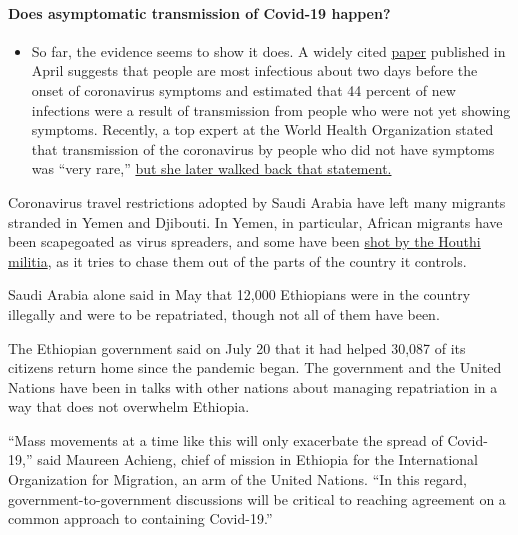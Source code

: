 \begin{itemize}
{  \paragraph{Does asymptomatic transmission of Covid-19
  happen?}\label{does-asymptomatic-transmission-of-covid-19-happen}}

  \begin{itemize}
  \tightlist
  \item
    So far, the evidence seems to show it does. A widely cited
    \href{https://www.nature.com/articles/s41591-020-0869-5}{paper}
    published in April suggests that people are most infectious about
    two days before the onset of coronavirus symptoms and estimated that
    44 percent of new infections were a result of transmission from
    people who were not yet showing symptoms. Recently, a top expert at
    the World Health Organization stated that transmission of the
    coronavirus by people who did not have symptoms was ``very rare,''
    \href{https://www.nytimes.com/2020/06/09/world/coronavirus-updates.html?action=click\&pgtype=Article\&state=default\&region=MAIN_CONTENT_3\&context=storylines_faq\#link-1f302e21}{but
    she later walked back that statement.}
  \end{itemize}
\end{itemize}

Coronavirus travel restrictions adopted by Saudi Arabia have left many
migrants stranded in Yemen and Djibouti. In Yemen, in particular,
African migrants have been scapegoated as virus spreaders, and some have
been
\href{https://www.nytimes.com/2020/06/28/world/middleeast/coronavirus-yemen-african-migrants.html}{shot
by the Houthi militia}, as it tries to chase them out of the parts of
the country it controls.

Saudi Arabia alone said in May that 12,000 Ethiopians were in the
country illegally and were to be repatriated, though not all of them
have been.

The Ethiopian government said on July 20 that it had helped 30,087 of
its citizens return home since the pandemic began. The government and
the United Nations have been in talks with other nations about managing
repatriation in a way that does not overwhelm Ethiopia.

``Mass movements at a time like this will only exacerbate the spread of
Covid-19,'' said Maureen Achieng, chief of mission in Ethiopia for the
International Organization for Migration, an arm of the United Nations.
``In this regard, government-to-government discussions will be critical
to reaching agreement on a common approach to containing Covid-19.''

